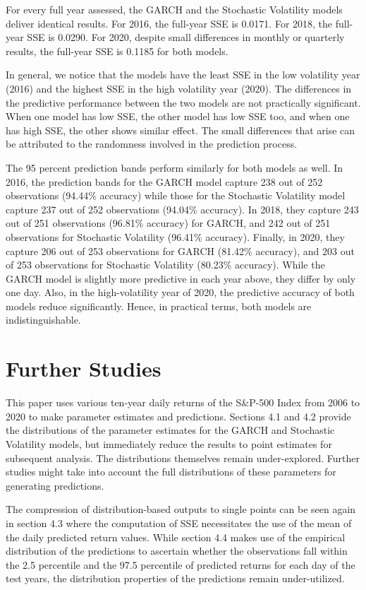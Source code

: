 \documentclass[12pt,letterpaper,reqno,fleqn]{article}
\begin{document}
For every full year assessed, the GARCH and the Stochastic Volatility models deliver identical results. For 2016, the full-year SSE is 0.0171. For 2018, the full-year SSE is 0.0290. For 2020, despite small differences in monthly or quarterly results, the full-year SSE is 0.1185 for both models. 

In general, we notice that the models have the least SSE in the low volatility year (2016) and the highest SSE in the high volatility year (2020).
The differences in the predictive performance between the two models are not practically significant. When one model has low SSE, the other model has low SSE too, and when one has high SSE, the other shows similar effect. The small differences that arise can be attributed to the randomness involved in the prediction process. 

The 95 percent prediction bands perform similarly for both models as well. In 2016, the prediction bands for the GARCH model capture 238 out of 252 observations (94.44\% accuracy) while those for the Stochastic Volatility model capture 237 out of 252 observations (94.04\% accuracy). In 2018, they capture 243 out of 251 observations (96.81\% accuracy) for GARCH, and 242 out of 251 observations for Stochastic Volatility (96.41\% accuracy). Finally, in 2020, they capture 206 out of 253 observations for GARCH (81.42\% accuracy), and 203 out of 253 observations for Stochastic Volatility (80.23\% accuracy). While the GARCH model is slightly more predictive in each year above, they differ by only one day. Also, in the high-volatility year of 2020, the predictive accuracy of both models reduce significantly. Hence, in practical terms, both models are indistinguishable. 


\newpage
\section{Further Studies}
This paper uses various ten-year daily returns of the S\&P-500 Index from 2006 to 2020 to make parameter estimates and predictions. Sections 4.1 and 4.2 provide the distributions of the parameter estimates for the GARCH and Stochastic Volatility models, but immediately reduce the results to point estimates for subsequent analysis. The distributions themselves remain under-explored. Further studies might take into account the full distributions of these parameters for generating predictions. 

The compression of distribution-based outputs to single points can be seen again in section 4.3 where the computation of SSE necessitates the use of the mean of the daily predicted return values. While section 4.4 makes use of the empirical distribution of the predictions to ascertain whether the observations fall within the 2.5 percentile and the 97.5 percentile of predicted returns for each day of the test years, the distribution properties of the predictions remain under-utilized. 
\end{document}
